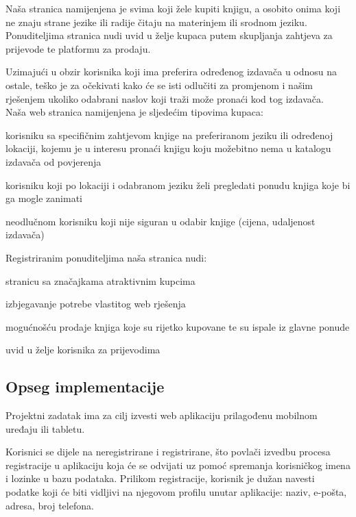 		Naša stranica namijenjena je svima koji žele kupiti knjigu, a osobito onima koji ne znaju strane jezike ili radije čitaju na materinjem ili srodnom jeziku. Ponuditeljima stranica nudi uvid u želje kupaca putem skupljanja zahtjeva za prijevode te platformu za prodaju.
		
		Uzimajući u obzir korisnika koji ima preferira određenog izdavača u odnosu na ostale, teško je za očekivati kako će se isti odlučiti za promjenom i našim rješenjem ukoliko odabrani naslov koji traži može pronaći kod tog izdavača.\\
		
		\noindent
		Naša web stranica namijenjena je sljedećim tipovima kupaca:
		
		\begin{packed_enum}
			\item korisniku sa specifičnim zahtjevom knjige na preferiranom jeziku ili određenoj lokaciji, kojemu je u interesu pronaći knjigu koju možebitno nema u katalogu izdavača od povjerenja
			\item korisniku koji po lokaciji i odabranom jeziku želi pregledati ponudu knjiga koje bi ga mogle zanimati
			\item neodlučnom korisniku koji nije siguran u odabir knjige (cijena, udaljenost izdavača)
		\end{packed_enum}
		
		\noindent
		Registriranim ponuditeljima naša stranica nudi:	
		
		\begin{packed_enum}
			\item stranicu sa značajkama atraktivnim kupcima
			\item izbjegavanje potrebe vlastitog web rješenja
			\item mogućnošću prodaje knjiga koje su rijetko kupovane te su ispale iz glavne ponude
			\item uvid u želje korisnika za prijevodima
		\end{packed_enum}
		
		\subsection*{Opseg implementacije}
		
		Projektni zadatak ima za cilj izvesti web aplikaciju prilagođenu mobilnom uređaju ili tabletu.
		
		Korisnici se dijele na neregistrirane i registrirane, što povlači izvedbu procesa registracije u aplikaciju koja će se odvijati uz pomoć spremanja korisničkog imena i lozinke u bazu podataka. Prilikom registracije, korisnik je dužan navesti podatke koji će biti vidljivi na njegovom profilu unutar aplikacije: naziv, e-pošta, adresa, broj telefona.
		
